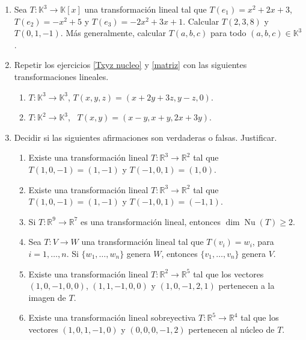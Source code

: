 \documentclass[12pt]{amsart}
\begin{document}
\begin{enumerate}[resume, topsep=5pt,itemsep=5pt]
  \item Sea $T: \mathbb{K}^3\longrightarrow\mathbb{K}[x]$ una transformaci\'on lineal tal que $T(e_1)=x^2+2x+3$, $T(e_2)=-x^2+5$ y $T(e_3)=-2x^2+3x+1$. Calcular $T(2,3,8)$ y $T(0,1,-1)$. M\'as generalmente, calcular $T(a,b,c)$ para todo $(a,b,c)\in\mathbb{K}^3$.
  
  \item Repetir los ejercicios \eqref{Txyz nucleo} y \eqref{matriz} con las siguientes transformaciones lineales.
\begin{enumerate}[topsep=5pt,itemsep=5pt]
 \item $T:\mathbb{K}^3\longrightarrow\mathbb{K}^3$, $T(x,y,z)=(x+2y+3z, y-z,0)$.
 \item $T:\mathbb{K}^2 \longrightarrow \mathbb{K}^3$, \ $T(x,y)=(x-y,x+y,2x+3y)$.
\end{enumerate}	


\item Decidir si las siguientes afirmaciones son verdaderas o falsas. Justificar.

\begin{enumerate}
\item Existe una transformaci\' on lineal $T : \mathbb R^3 \to \mathbb R^2$ tal que $T(1, 0,-1) = (1, -1)$ y $T(-1, 0, 1) = (1, 0)$.
\item Existe una transformaci\' on lineal $T : \mathbb R^3 \to \mathbb R^2$ tal que $T(1, 0,-1) = (1, -1)$ y $T(-1, 0, 1) = (-1, 1)$.
\item  Si $T : \mathbb R^9 \to \mathbb R^7$ es una transformaci\' on lineal, entonces $\dim \operatorname{Nu}(T) \geq  2$.
\item Sea $T : V \to W$ una transformaci\' on lineal tal que $T(v_i) = w_i$, para $i = 1, \dots , n$. Si $\{w_1, \dots , w_n\}$ genera $W$, entonces
$\{v_1, \dots , v_n\}$ genera $V$.
\item Existe una transformaci\' on lineal $T : \mathbb R^2 \to \mathbb R^5$ tal que los vectores $(1, 0, -1, 0, 0)$, $(1, 1, -1, 0, 0)$ y $(1, 0, -1, 2, 1)$ pertenecen a la imagen de $T$.
\item Existe una transformaci\' on lineal sobreyectiva $T : \mathbb R^5 \to \mathbb R^4$ tal que los vectores $(1, 0, 1, -1, 0)$ y $(0, 0, 0, -1, 2)$
pertenecen al n\' ucleo de $T$.
\end{enumerate}



\end{enumerate}
\end{document}
